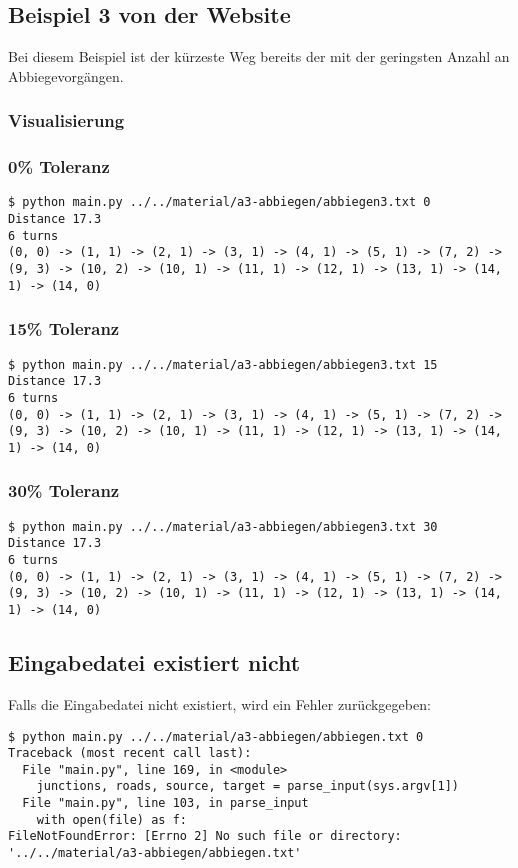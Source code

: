 \documentclass[a4paper,10pt,ngerman]{scrartcl}
\begin{document}
\subsection{Beispiel 3 von der Website}
Bei diesem Beispiel ist der kürzeste Weg bereits der mit der geringsten Anzahl an Abbiegevorgängen.
\subsubsection{Visualisierung}


\subsubsection{0\% Toleranz}
\begin{lstlisting}
$ python main.py ../../material/a3-abbiegen/abbiegen3.txt 0
Distance 17.3
6 turns
(0, 0) -> (1, 1) -> (2, 1) -> (3, 1) -> (4, 1) -> (5, 1) -> (7, 2) -> (9, 3) -> (10, 2) -> (10, 1) -> (11, 1) -> (12, 1) -> (13, 1) -> (14, 1) -> (14, 0)
\end{lstlisting}

\subsubsection{15\% Toleranz}
\begin{lstlisting}
$ python main.py ../../material/a3-abbiegen/abbiegen3.txt 15
Distance 17.3
6 turns
(0, 0) -> (1, 1) -> (2, 1) -> (3, 1) -> (4, 1) -> (5, 1) -> (7, 2) -> (9, 3) -> (10, 2) -> (10, 1) -> (11, 1) -> (12, 1) -> (13, 1) -> (14, 1) -> (14, 0)
\end{lstlisting}

\subsubsection{30\% Toleranz}
\begin{lstlisting}
$ python main.py ../../material/a3-abbiegen/abbiegen3.txt 30
Distance 17.3
6 turns
(0, 0) -> (1, 1) -> (2, 1) -> (3, 1) -> (4, 1) -> (5, 1) -> (7, 2) -> (9, 3) -> (10, 2) -> (10, 1) -> (11, 1) -> (12, 1) -> (13, 1) -> (14, 1) -> (14, 0)
\end{lstlisting}

\subsection{Eingabedatei existiert nicht}
Falls die Eingabedatei nicht existiert, wird ein Fehler zurückgegeben:
\begin{lstlisting}
$ python main.py ../../material/a3-abbiegen/abbiegen.txt 0
Traceback (most recent call last):
  File "main.py", line 169, in <module>
    junctions, roads, source, target = parse_input(sys.argv[1])
  File "main.py", line 103, in parse_input
    with open(file) as f:
FileNotFoundError: [Errno 2] No such file or directory: '../../material/a3-abbiegen/abbiegen.txt'
\end{lstlisting}
\end{document}
